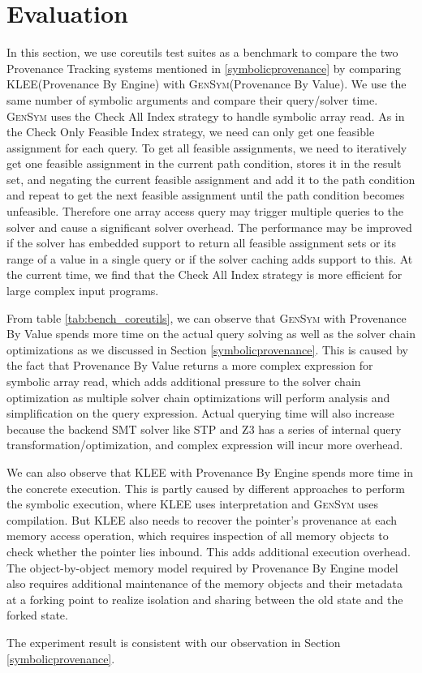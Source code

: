 \documentclass[sigplan, nonacm]{acmart}\settopmatter{printfolios=true,printccs=false,printacmref=false}
\newcommand{\tool}{\textsc{GenSym}\xspace}
\newcommand{\klee}{\textsc{KLEE}\xspace}
\begin{document}
\section{Evaluation}\label{evaluation}

In this section, we use coreutils test suites as a benchmark to compare the two Provenance Tracking systems mentioned in \ref{symbolicprovenance} by comparing \klee (Provenance By Engine) with \tool (Provenance By Value). We use the same number of symbolic arguments and compare their query/solver time. \tool uses the Check All Index strategy to handle symbolic array read. As in the Check Only Feasible Index strategy,  we need can only get one feasible assignment for each query. To get all feasible assignments, we need to iteratively get one feasible assignment in the current path condition, stores it in the result set, and negating the current feasible assignment and add it to the path condition and repeat to get the next feasible assignment until the path condition becomes unfeasible. Therefore one array access query may trigger multiple queries to the solver and cause a significant solver overhead. The performance may be improved if the solver has embedded support to return all feasible assignment sets or its range of a value in a single query or if the solver caching adds support to this. At the current time, we find that the Check All Index strategy is more efficient for large complex input programs.\par
From table \ref{tab:bench_coreutils}, we can observe that \tool with Provenance By Value spends more time on the actual query solving as well as the solver chain optimizations as we discussed in Section \ref{symbolicprovenance}. This is caused by the fact that Provenance By Value returns a more complex expression for symbolic array read, which adds additional pressure to the solver chain optimization as multiple solver chain optimizations will perform analysis and simplification on the query expression. Actual querying time will also increase because the backend SMT solver like STP and Z3 has a series of internal query transformation/optimization, and complex expression will incur more overhead.\par
We can also observe that \klee with Provenance By Engine spends more time in the concrete execution. This is partly caused by different approaches to perform the symbolic execution, where \klee uses interpretation and \tool uses compilation. But \klee also needs to recover the pointer's provenance at each memory access operation, which requires inspection of all memory objects to check whether the pointer lies inbound. This adds additional execution overhead. The object-by-object memory model required by Provenance By Engine model also requires additional maintenance of the memory objects and their metadata at a forking point to realize isolation and sharing between the old state and the forked state.\par
The experiment result is consistent with our observation in Section \ref{symbolicprovenance}.
\end{document}
